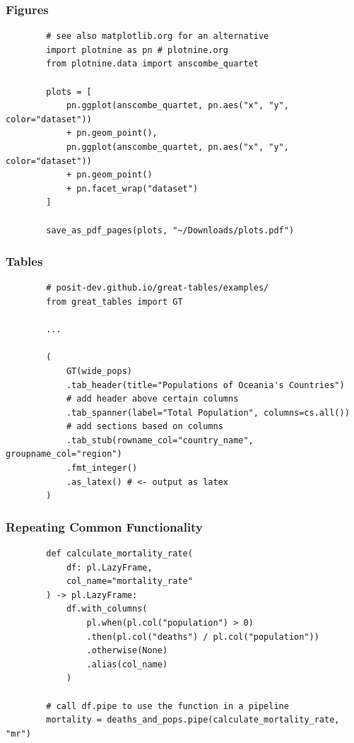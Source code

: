 \documentclass{ali-presentation}
\begin{document}
\begin{frame}[fragile]
    \frametitle{Figures}

    \begin{verbatim}
        # see also matplotlib.org for an alternative
        import plotnine as pn # plotnine.org
        from plotnine.data import anscombe_quartet 

        plots = [
            pn.ggplot(anscombe_quartet, pn.aes("x", "y", color="dataset"))
            + pn.geom_point(),
            pn.ggplot(anscombe_quartet, pn.aes("x", "y", color="dataset"))
            + pn.geom_point()
            + pn.facet_wrap("dataset")
        ]

        save_as_pdf_pages(plots, "~/Downloads/plots.pdf")
    \end{verbatim}
\end{frame}

\begin{frame}[fragile]
    \frametitle{Tables}

    \begin{verbatim}
        # posit-dev.github.io/great-tables/examples/
        from great_tables import GT

        ...

        (
            GT(wide_pops)
            .tab_header(title="Populations of Oceania's Countries")
            # add header above certain columns
            .tab_spanner(label="Total Population", columns=cs.all())
            # add sections based on columns
            .tab_stub(rowname_col="country_name", groupname_col="region")
            .fmt_integer()
            .as_latex() # <- output as latex
        )
    \end{verbatim}
\end{frame}

\begin{frame}[fragile]
    \frametitle{Repeating Common Functionality}

    \begin{verbatim}
        def calculate_mortality_rate(
            df: pl.LazyFrame,
            col_name="mortality_rate"
        ) -> pl.LazyFrame:
            df.with_columns(
                pl.when(pl.col("population") > 0)
                .then(pl.col("deaths") / pl.col("population"))
                .otherwise(None)
                .alias(col_name)
            ) 

        # call df.pipe to use the function in a pipeline
        mortality = deaths_and_pops.pipe(calculate_mortality_rate, "mr")
    \end{verbatim}
\end{frame}
\end{document}
